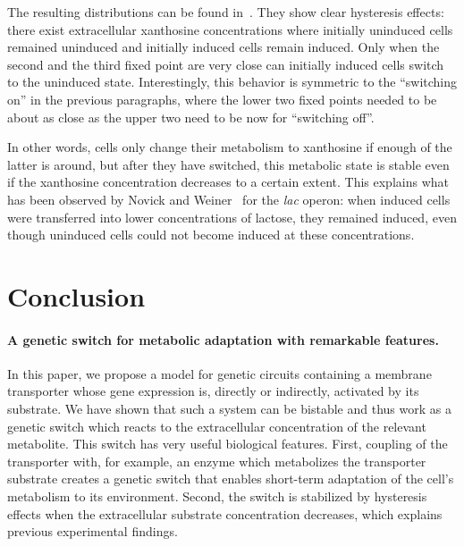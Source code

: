 \documentclass[10pt,letterpaper]{article}
\newcommand{\unit}[1]{\,\mathrm{#1}}
\newcommand{\n}[1]{\mathrm{#1}}
\newcommand*{\defeq}{\mathrel{\vcenter{\baselineskip0.5ex \lineskiplimit0pt
			\hbox{\scriptsize.}\hbox{\scriptsize.}}}%
	=}
\begin{document}
The resulting distributions can be found in~. They show
clear hysteresis effects: there exist extracellular xanthosine concentrations where
initially uninduced cells remained uninduced and initially induced cells remain induced.
Only when the second and the third fixed point are very close can initially
induced cells switch to the uninduced state. Interestingly, this
behavior is symmetric to the ``switching on'' in the previous paragraphs,
where the lower two fixed points needed to be about as close as the upper
two need to be now for ``switching off''. %

In other words, cells only change their metabolism to xanthosine if
enough of the latter is around, but after they have switched, this metabolic
state is stable even if the xanthosine concentration decreases to a certain
extent. This explains what has been observed by Novick and
Weiner~\cite{Novick1957} for the \emph{lac} operon: when induced cells were
transferred into lower concentrations of lactose, they remained induced,
even though uninduced cells could not become induced at these
concentrations.


\section*{Conclusion}
\paragraph*{A genetic switch for metabolic adaptation with remarkable features.}
In this paper, we propose a model for genetic circuits containing
a membrane transporter whose gene expression is, directly or indirectly,
activated by its substrate. We have shown that such a system can be bistable
and thus work as a genetic switch which reacts to the extracellular
concentration of the relevant metabolite. This switch has very useful
biological features. First, coupling of the transporter with, for example, an
enzyme which metabolizes the transporter substrate creates a genetic switch that enables short-term
adaptation of the cell's metabolism to its environment. Second, the switch
is stabilized by hysteresis effects when the extracellular substrate
concentration decreases, which explains previous experimental findings.
\end{document}

